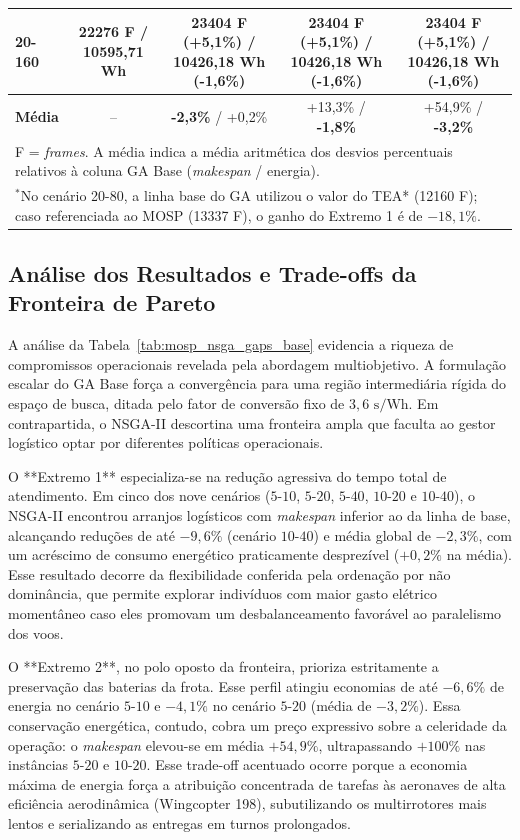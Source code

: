 \begin{table}[htbp]
{\begin{tabular}{l c c c c}
20-160 & \textbf{22276 F} / 10595{,}71 Wh & 23404 F (+5{,}1\%) / \textbf{10426{,}18 Wh (-1{,}6\%)} & 23404 F (+5{,}1\%) / \textbf{10426{,}18 Wh (-1{,}6\%)} & 23404 F (+5{,}1\%) / \textbf{10426{,}18 Wh (-1{,}6\%)} \\
\midrule
\textbf{Média} & -- & \textbf{-2{,}3\%} / +0{,}2\% & +13{,}3\% / \textbf{-1{,}8\%} & +54{,}9\% / \textbf{-3{,}2\%} \\
\bottomrule
\multicolumn{5}{l}{\footnotesize F = \textit{frames}. A média indica a média aritmética dos desvios percentuais relativos à coluna GA Base (\textit{makespan} / energia).} \\
\multicolumn{5}{l}{\footnotesize $^*$No cenário 20-80, a linha base do GA utilizou o valor do TEA* (12160 F); caso referenciada ao MOSP (13337 F), o ganho do Extremo 1 é de $-18{,}1\%$.}
\end{tabular}%
}
\end{table}

\subsection*{Análise dos Resultados e Trade-offs da Fronteira de Pareto}

A análise da Tabela~\ref{tab:mosp_nsga_gaps_base} evidencia a riqueza de compromissos operacionais revelada pela abordagem multiobjetivo. A formulação escalar do GA Base força a convergência para uma região intermediária rígida do espaço de busca, ditada pelo fator de conversão fixo de $3{,}6\text{ s/Wh}$. Em contrapartida, o NSGA-II descortina uma fronteira ampla que faculta ao gestor logístico optar por diferentes políticas operacionais.

O **Extremo 1** especializa-se na redução agressiva do tempo total de atendimento. Em cinco dos nove cenários ($5\text{-}10$, $5\text{-}20$, $5\text{-}40$, $10\text{-}20$ e $10\text{-}40$), o NSGA-II encontrou arranjos logísticos com \textit{makespan} inferior ao da linha de base, alcançando reduções de até $-9{,}6\%$ (cenário $10\text{-}40$) e média global de $-2{,}3\%$, com um acréscimo de consumo energético praticamente desprezível ($+0{,}2\%$ na média). Esse resultado decorre da flexibilidade conferida pela ordenação por não dominância, que permite explorar indivíduos com maior gasto elétrico momentâneo caso eles promovam um desbalanceamento favorável ao paralelismo dos voos.

O **Extremo 2**, no polo oposto da fronteira, prioriza estritamente a preservação das baterias da frota. Esse perfil atingiu economias de até $-6{,}6\%$ de energia no cenário $5\text{-}10$ e $-4{,}1\%$ no cenário $5\text{-}20$ (média de $-3{,}2\%$). Essa conservação energética, contudo, cobra um preço expressivo sobre a celeridade da operação: o \textit{makespan} elevou-se em média $+54{,}9\%$, ultrapassando $+100\%$ nas instâncias $5\text{-}20$ e $10\text{-}20$. Esse trade-off acentuado ocorre porque a economia máxima de energia força a atribuição concentrada de tarefas às aeronaves de alta eficiência aerodinâmica (Wingcopter 198), subutilizando os multirrotores mais lentos e serializando as entregas em turnos prolongados.


